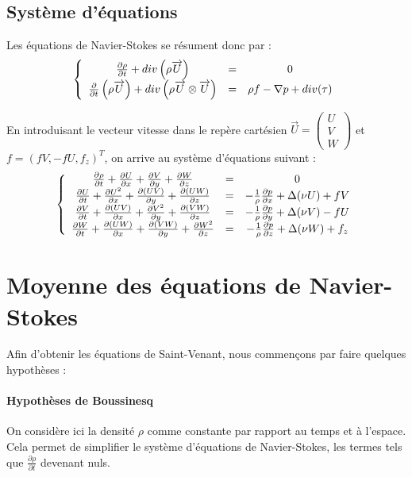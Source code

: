	\subsection{Système d'équations}
Les équations de Navier-Stokes se résument donc par :
\[\left\{ \begin{array}{c c c}
	\frac{\partial \rho}{\partial t} + div\left(\rho \overrightarrow{U}\right)&=&0\\
	\frac{\partial}{\partial t} \left( \rho \overrightarrow{U} \right) + div\left( \rho \overrightarrow{U} \otimes \overrightarrow{U}\right) &=& \rho f -\nabla p + div(\tau)
\end{array}\right.\]

En introduisant le vecteur vitesse dans le repère cartésien $\overrightarrow{U}=\begin{pmatrix} U \\ V \\ W \end{pmatrix}$ et $f=(fV,-fU,f_z)^T$, on arrive au système d'équations suivant :
\[\left\{ \begin{array}{c c c}
	\frac{\partial \rho}{\partial t} + \frac{\partial U}{\partial x} + \frac{\partial V}{\partial y} +\frac{\partial W}{\partial z}&=&0\\
     \frac{\partial U}{\partial t} + \frac{\partial U^2}{\partial x} + \frac{\partial (UV)}{\partial y} +\frac{\partial (UW)}{\partial z} &=& -\frac{1}{\rho}\frac{\partial p}{\partial x} + \Delta(\nu U)+fV\\
	\frac{\partial V}{\partial t} + \frac{\partial (UV)}{\partial x} + \frac{\partial V^2}{\partial y} +\frac{\partial (VW)}{\partial z} &=& -\frac{1}{\rho}\frac{\partial p}{\partial y} + \Delta(\nu V)-fU\\
	\frac{\partial W}{\partial t} + \frac{\partial (UW)}{\partial x} + \frac{\partial (VW)}{\partial y} +\frac{\partial W^2}{\partial z} &=& -\frac{1}{\rho}\frac{\partial p}{\partial z} + \Delta(\nu W)+f_z
\end{array}\right.\]


\section{Moyenne des équations de Navier-Stokes}
Afin d'obtenir les équations de Saint-Venant, nous commençons par faire quelques hypothèses :
	\paragraph{Hypothèses de Boussinesq}
On considère ici la densité $\rho$ comme constante par rapport au temps et à l'espace. Cela permet de simplifier le système d'équations de Navier-Stokes, les termes tels que $\frac{\partial \rho}{\partial t}$ devenant nuls.

